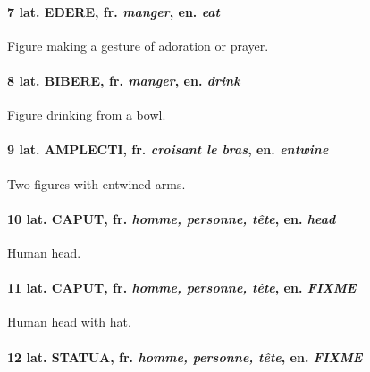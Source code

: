{%
 
\paragraph{\bfseries\large *7  {\mdseries\small lat.} EDERE, \mdseries \small fr. \textit{manger}, en. \textit{eat}} 
\mbox{}
\smallskip

Figure making a gesture of adoration or prayer.

 
\paragraph{\bfseries\large *8  {\mdseries\small lat.} BIBERE, \mdseries \small fr. \textit{manger}, en. \textit{drink}} 
\mbox{}
\smallskip

Figure drinking from a bowl.

 
\paragraph{\bfseries\large *9  {\mdseries\small lat.} AMPLECTI, \mdseries \small fr. \textit{croisant le bras}, en. \textit{entwine}} 
\mbox{}
\smallskip

Two figures with entwined arms.

 
\paragraph{\bfseries\large *10  {\mdseries\small lat.} CAPUT, \mdseries \small fr. \textit{homme, personne, tête}, en. \textit{head}} 
\mbox{}
\smallskip

Human head.

 
\paragraph{\bfseries\large *11  {\mdseries\small lat.} CAPUT, \mdseries \small fr. \textit{homme, personne, tête}, en. \textit{FIXME}} 
\mbox{}
\smallskip

Human head with hat.

 
\paragraph{\bfseries\large *12  {\mdseries\small lat.} STATUA, \mdseries \small fr. \textit{homme, personne, tête}, en. \textit{FIXME}} 
\mbox{}
\smallskip

}
